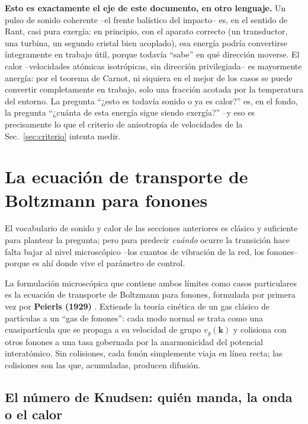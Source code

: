 \documentclass[11pt,a4paper]{article}
\begin{document}
\textbf{Esto es exactamente el eje de este documento, en otro lenguaje.} Un
pulso de sonido coherente --el frente balístico del impacto-- es, en el
sentido de Rant, casi pura exergía: en principio, con el aparato correcto
(un transductor, una turbina, un segundo cristal bien acoplado), esa
energía podría convertirse íntegramente en trabajo útil, porque todavía
``sabe'' en qué dirección moverse. El calor --velocidades atómicas
isotrópicas, sin dirección privilegiada-- es mayormente anergía: por el
teorema de Carnot, ni siquiera en el mejor de los casos se puede convertir
completamente en trabajo, solo una fracción acotada por la temperatura
del entorno. La pregunta ``¿esto es todavía sonido o ya es calor?'' es,
en el fondo, la pregunta ``¿cuánta de esta energía sigue siendo exergía?''
--y eso es precisamente lo que el criterio de anisotropía de
velocidades de la Sec.~\ref{sec:criterio} intenta medir.

\section{La ecuación de transporte de Boltzmann para fonones}
\label{sec:peierls}

El vocabulario de sonido y calor de las secciones anteriores es clásico y
suficiente para plantear la pregunta; pero para predecir \emph{cuándo}
ocurre la transición hace falta bajar al nivel microscópico --los cuantos
de vibración de la red, los fonones-- porque es ahí donde vive el
parámetro de control.

La formulación microscópica que contiene ambos límites como casos
particulares es la ecuación de transporte de Boltzmann para fonones,
formulada por primera vez por \textbf{Peierls (1929)}
\cite{Peierls1929}. Extiende la teoría cinética de un gas clásico de
partículas a un ``gas de fonones'': cada modo normal se trata como una
cuasipartícula que se propaga a su velocidad de grupo $v_g(\mathbf k)$ y
colisiona con otros fonones a una tasa gobernada por la anarmonicidad del
potencial interatómico. Sin colisiones, cada fonón simplemente viaja en
línea recta; las colisiones son las que, acumuladas, producen difusión.

\subsection{El número de Knudsen: quién manda, la onda o el calor}
\end{document}
